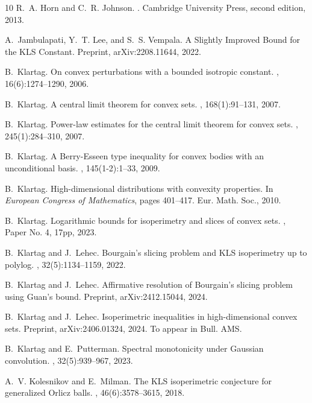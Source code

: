 \documentclass[12pt,a4paper]{article}
\theoremstyle{definition}
\begin{document}
\begin{thebibliography}{10}
R.~A. Horn and C.~R. Johnson.
.
\newblock Cambridge University Press, second edition, 2013.

A.~Jambulapati, Y.~T. Lee, and S.~S. Vempala.
\newblock A {Slightly} {Improved} {Bound} for the {KLS} {Constant}.
\newblock Preprint, {arXiv}:2208.11644, 2022.

B.~Klartag.
\newblock On convex perturbations with a bounded isotropic constant.
, 16(6):1274--1290, 2006.

B.~Klartag.
\newblock A central limit theorem for convex sets.
, 168(1):91--131, 2007.

B.~Klartag.
\newblock Power-law estimates for the central limit theorem for convex sets.
, 245(1):284--310, 2007.

B.~Klartag.
\newblock A {B}erry-{E}sseen type inequality for convex bodies with an
  unconditional basis.
, 145(1-2):1--33, 2009.

B.~Klartag.
\newblock High-dimensional distributions with convexity properties.
\newblock In {\em European {C}ongress of {M}athematics}, pages 401--417. Eur.
  Math. Soc., 2010.

B.~Klartag.
\newblock Logarithmic bounds for isoperimetry and slices of convex sets.
, Paper No. 4, 17pp, 2023.

B.~Klartag and J.~Lehec.
\newblock Bourgain's slicing problem and {KLS} isoperimetry up to polylog.
, 32(5):1134--1159, 2022.

B.~Klartag and J.~Lehec.
\newblock Affirmative resolution of {Bourgain}'s slicing problem using {Guan}'s
  bound.
\newblock Preprint, {arXiv}:2412.15044, 2024.

B.~Klartag and J.~Lehec.
\newblock Isoperimetric inequalities in high-dimensional convex sets.
\newblock Preprint, {arXiv}:2406.01324, 2024.
\newblock To appear in Bull. AMS.

B.~Klartag and E.~Putterman.
\newblock Spectral monotonicity under {Gaussian} convolution.
, 32(5):939--967, 2023.

A.~V. Kolesnikov and E.~Milman.
\newblock The {KLS} isoperimetric conjecture for generalized {O}rlicz balls.
, 46(6):3578--3615, 2018.


\end{thebibliography}
\end{document}

